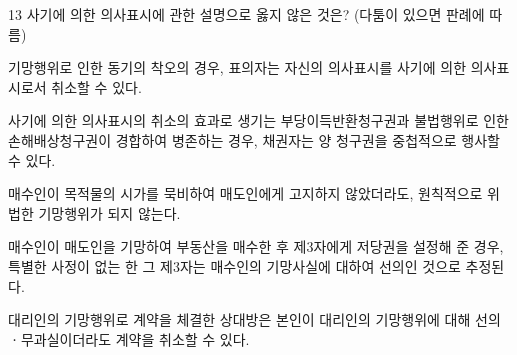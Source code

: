\begin{question}{13}
사기에 의한 의사표시에 관한 설명으로 옳지 않은 것은? (다툼이 있으면 판례에 따름)
\begin{choices}
  \item 기망행위로 인한 동기의 착오의 경우, 표의자는 자신의 의사표시를 사기에 의한 의사표시로서 취소할 수 있다.
  \item 사기에 의한 의사표시의 취소의 효과로 생기는 부당이득반환청구권과 불법행위로 인한 손해배상청구권이 경합하여 병존하는 경우, 채권자는 양 청구권을 중첩적으로 행사할 수 있다.
  \item 매수인이 목적물의 시가를 묵비하여 매도인에게 고지하지 않았더라도, 원칙적으로 위법한 기망행위가 되지 않는다.
  \item 매수인이 매도인을 기망하여 부동산을 매수한 후 제3자에게 저당권을 설정해 준 경우, 특별한 사정이 없는 한 그 제3자는 매수인의 기망사실에 대하여 선의인 것으로 추정된다.
  \item 대리인의 기망행위로 계약을 체결한 상대방은 본인이 대리인의 기망행위에 대해 선의ㆍ무과실이더라도 계약을 취소할 수 있다.
\end{choices}
\end{question}
